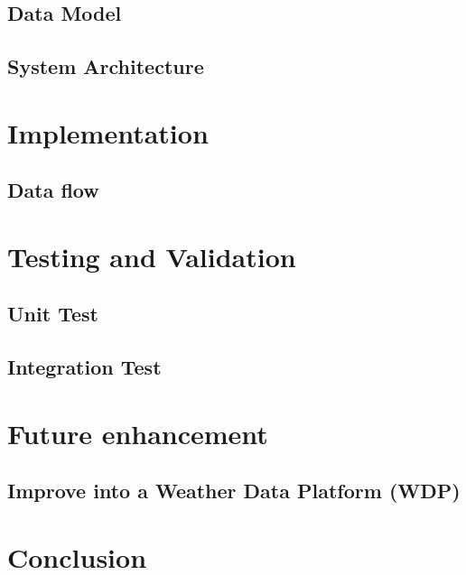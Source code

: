 \documentclass[12pt, a4paper]{report}
\theoremstyle{definition}
\begin{document}
\section{Data Model}

\section{System Architecture}


\newpage
\chapter{Implementation}
\section{Data flow}



\chapter{Testing and Validation}
\section{Unit Test}

\section{Integration Test}


\newpage
\chapter{Future enhancement}
\section*{Improve into a Weather Data Platform (WDP)}


\newpage
\chapter{Conclusion}




\end{document}

